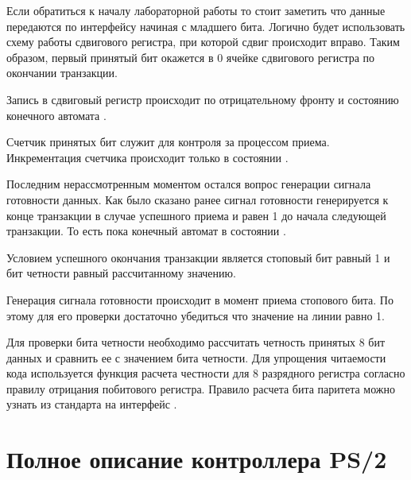 \par{Если обратиться к началу лабораторной работы то стоит заметить что данные передаются по интерфейсу  начиная с младшего бита. Логично будет использовать схему работы сдвигового регистра, при которой сдвиг происходит вправо. Таким образом, первый принятый бит окажется в 0 ячейке сдвигового регистра по окончании транзакции.}

\par{Запись в сдвиговый регистр происходит по отрицательному фронту  и состоянию конечного автомата .}



\par{Счетчик принятых бит служит для контроля за процессом приема. Инкрементация счетчика происходит только в состоянии .}



\par{Последним нерассмотренным моментом остался вопрос генерации сигнала готовности данных. Как было сказано ранее сигнал готовности генерируется к конце транзакции в случае успешного приема и равен 1 до начала следующей транзакции. То есть пока конечный автомат в состоянии .}

\par{Условием успешного окончания транзакции является стоповый бит равный 1 и бит четности равный рассчитанному значению.}

\par{Генерация сигнала готовности происходит в момент приема стопового бита. По этому для его проверки достаточно убедиться что значение на линии  равно 1.}

\par{Для проверки бита четности необходимо рассчитать четность принятых 8 бит данных и сравнить ее с значением бита четности. Для упрощения читаемости кода используется функция расчета честности для 8 разрядного регистра согласно правилу отрицания побитового  регистра. Правило расчета бита паритета можно узнать из стандарта на интерфейс .}




\section{Полное описание контроллера PS/2}

